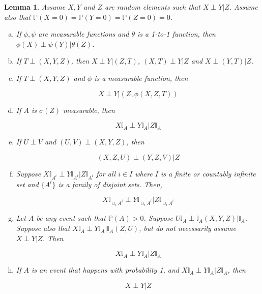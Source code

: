 \documentclass[12pt]{article}
\newcommand{\mb}{\mathbb}
\newcommand{\pr}{\mb{P}}							%
\newcommand{\indx}[1]{^{#1}}						%
\newcommand{\Xf}{X}									%
\newcommand{\Xg}{Y}									%
\newcommand{\Xh}{Z}									%
\newcommand{\Xj}{T}								%
\newcommand{\typset}{A}							%
\newtheorem{lem}[thms]{Lemma}
\begin{document}
\begin{lem}
Assume \(\Xf,\Xg\) and \(\Xh\) are random elements such that \(\Xf\perp \Xg|\Xh\). Assume also that \(\pr(\Xf=0) = \pr(\Xg=0) = \pr(\Xh=0) = 0\).

\begin{enumerate}[(a)]
\item If \(\phi,\psi\) are measurable functions and \(\theta\) is a 1-to-1 function, then \(\phi(\Xf)\perp \psi(\Xg)|\theta(\Xh)\).

\item If \(\Xj\perp(\Xf,\Xg,\Xh)\), then \(\Xf\perp \Xg|(\Xh,\Xj)\), \((\Xf,\Xj)\perp \Xg|\Xh\) and \(\Xf\perp (\Xg,\Xj)|\Xh\).

\item If \(\Xj\perp (\Xf,\Xg,\Xh)\) and \(\phi\) is a measurable function, then

\[\Xf\perp \Xg|(\Xh,\phi(\Xf,\Xh,\Xj))\]

\item If \(\typset\) is \(\sigma(\Xh)\) measurable, then 

\[\Xf\mb{I}_\typset\perp \Xg\mb{I}_\typset|\Xh\mb{I}_\typset\]

\item If \(U\perp V\) and \((U,V)\perp(\Xf,\Xg,\Xh)\), then 

\[(\Xf,\Xh,U)\perp (\Xg,\Xh,V)|\Xh\]

\item Suppose \(\Xf\mb{I}_{\typset\indx{i}}\perp \Xg\mb{I}_{\typset\indx{i}}|\Xh\mb{I}_{\typset\indx{i}}\) for all \(i\in I\) where \(I\) is a finite or countably infinite set and \(\{\typset\indx{i}\}\) is a family of disjoint sets. Then,

\[\Xf\mb{I}_{\cup_i \typset\indx{i}}\perp \Xg\mb{I}_{\cup_i \typset\indx{i}}|\Xh\mb{I}_{\cup_i \typset\indx{i}}\]

\item Let \(\typset\) be any event such that \(\pr(\typset) > 0\). Suppose \(U\mb{I}_\typset\perp \mb{I}_\typset(\Xf,\Xg,\Xh)|\mb{I}_\typset\). Suppose also that \(\Xf\mb{I}_\typset\perp \Xg\mb{I}_\typset|\mb{I}_\typset(\Xh,U)\), but do not necessarily assume \(\Xf\perp \Xg|\Xh\). Then 

\[\Xf\mb{I}_\typset\perp \Xg\mb{I}_\typset|\Xh\mb{I}_\typset\]

\item If \(\typset\) is an event that happens with probability 1, and \(\Xf\mb{I}_\typset \perp \Xg\mb{I}_\typset |\Xh\mb{I}_\typset\), then 

\[\Xf\perp \Xg |\Xh\]
\end{enumerate}
\label{TL::Props}
\end{lem}
\end{document}
